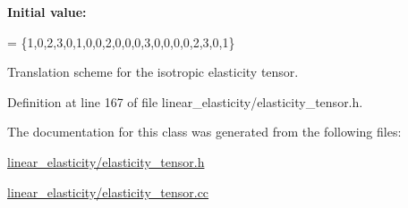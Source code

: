 {\bfseries Initial value\+:}
\begin{DoxyCode}
=
 \{1,0,2,3,0,1,0,0,2,0,0,0,3,0,0,0,0,2,3,0,1\}
\end{DoxyCode}


Translation scheme for the isotropic elasticity tensor. 



Definition at line 167 of file linear\+\_\+elasticity/elasticity\+\_\+tensor.\+h.



The documentation for this class was generated from the following files\+:\begin{DoxyCompactItemize}
\item 
\hyperlink{linear__elasticity_2elasticity__tensor_8h}{linear\+\_\+elasticity/elasticity\+\_\+tensor.\+h}\item 
\hyperlink{linear__elasticity_2elasticity__tensor_8cc}{linear\+\_\+elasticity/elasticity\+\_\+tensor.\+cc}\end{DoxyCompactItemize}
